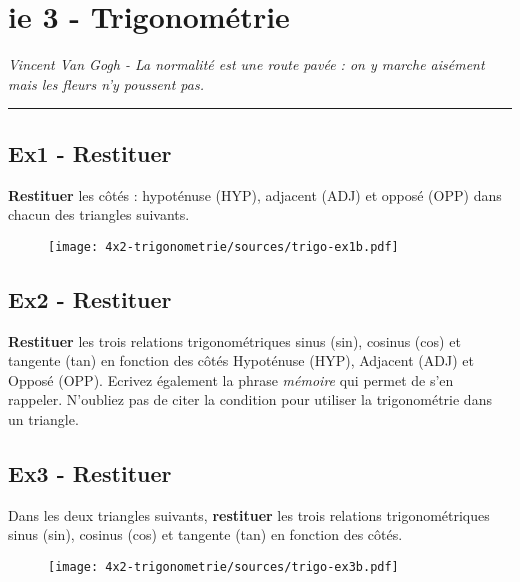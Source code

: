 \documentclass[12pt]{article}
\newcommand{\horrule}[1]{\rule{\linewidth}{#1}} %
\begin{document}
\newpage

\section*{ie 3 - Trigonométrie}
\begin{center}
  \textit{Vincent Van Gogh - La normalité est une route pavée : on y marche aisément mais les fleurs n’y poussent pas.}
\end{center}
\horrule{2px}

\subsection*{Ex1 - Restituer}

\textbf{Restituer} les côtés : hypoténuse (HYP), adjacent (ADJ) et opposé (OPP) dans chacun des triangles suivants.

  \begin{figure}[H]
    \centering
    \texttt{[image: 4x2-trigonometrie/sources/trigo-ex1b.pdf]}
  \end{figure}



\subsection*{Ex2 - Restituer}

\textbf{Restituer} les trois relations trigonométriques sinus (sin), cosinus (cos) et tangente (tan) en fonction des côtés Hypoténuse (HYP), Adjacent (ADJ) et Opposé (OPP). Ecrivez également la phrase \textit{mémoire} qui permet de s'en rappeler. N'oubliez pas de citer la condition pour utiliser la trigonométrie dans un triangle.

\subsection*{Ex3 - Restituer}

\begin{multicols}{2}

Dans les deux triangles suivants, \textbf{restituer} les trois relations trigonométriques sinus (sin), cosinus (cos) et tangente (tan) en fonction des côtés.

  \begin{figure}[H]
    \centering
    \texttt{[image: 4x2-trigonometrie/sources/trigo-ex3b.pdf]}
  \end{figure}
\end{multicols}
\end{document}
